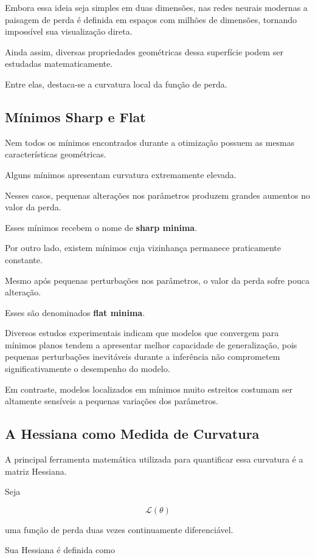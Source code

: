 \documentclass[12pt, a4paper]{article}
\begin{document}
Embora essa ideia seja simples em duas dimensões, nas redes neurais modernas a paisagem de perda é definida em espaços com milhões de dimensões, tornando impossível sua visualização direta.

Ainda assim, diversas propriedades geométricas dessa superfície podem ser estudadas matematicamente.

Entre elas, destaca-se a curvatura local da função de perda.

\subsection{Mínimos Sharp e Flat}

Nem todos os mínimos encontrados durante a otimização possuem as mesmas características geométricas.

Alguns mínimos apresentam curvatura extremamente elevada.

Nesses casos, pequenas alterações nos parâmetros produzem grandes aumentos no valor da perda.

Esses mínimos recebem o nome de \textbf{sharp minima}.

Por outro lado, existem mínimos cuja vizinhança permanece praticamente constante.

Mesmo após pequenas perturbações nos parâmetros, o valor da perda sofre pouca alteração.

Esses são denominados \textbf{flat minima}.

Diversos estudos experimentais indicam que modelos que convergem para mínimos planos tendem a apresentar melhor capacidade de generalização, pois pequenas perturbações inevitáveis durante a inferência não comprometem significativamente o desempenho do modelo.

Em contraste, modelos localizados em mínimos muito estreitos costumam ser altamente sensíveis a pequenas variações dos parâmetros.

\subsection{A Hessiana como Medida de Curvatura}

A principal ferramenta matemática utilizada para quantificar essa curvatura é a matriz Hessiana.

Seja

\[
\mathcal{L}(\theta)
\]

uma função de perda duas vezes continuamente diferenciável.

Sua Hessiana é definida como
\end{document}
